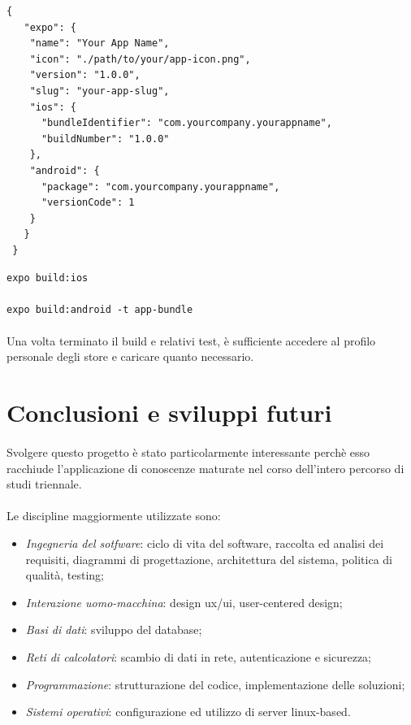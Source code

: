 \documentclass[11pt,a4paper,english]{article}
\begin{document}
\begin{lstlisting}[title=Struttura del file di configurazione]
{
   "expo": {
    "name": "Your App Name",
    "icon": "./path/to/your/app-icon.png",
    "version": "1.0.0",
    "slug": "your-app-slug",
    "ios": {
      "bundleIdentifier": "com.yourcompany.yourappname",
      "buildNumber": "1.0.0"
    },
    "android": {
      "package": "com.yourcompany.yourappname",
      "versionCode": 1
    }
   }
 }
\end{lstlisting}

\begin{lstlisting}[title=Comandi per effettuare il build delle due app]
expo build:ios     

expo build:android -t app-bundle
\end{lstlisting}

\paragraph{} Una volta terminato il build e relativi test, è sufficiente accedere al profilo personale degli store e caricare quanto necessario. 


\section{Conclusioni e sviluppi futuri}

\paragraph{} Svolgere questo progetto è stato particolarmente interessante perchè esso racchiude l'applicazione di conoscenze maturate nel corso dell'intero percorso di studi triennale. 

\paragraph{} Le discipline maggiormente utilizzate sono:
\begin{itemize}
    \item \emph{Ingegneria del sotfware}: ciclo di vita del software, raccolta ed analisi dei requisiti, diagrammi di progettazione, architettura del sistema, politica di qualità, testing;
    \item \emph{Interazione uomo-macchina}: design ux/ui, user-centered design;
    \item \emph{Basi di dati}: sviluppo del database;
    \item \emph{Reti di calcolatori}: scambio di dati in rete, autenticazione e sicurezza;
    \item \emph{Programmazione}: strutturazione del codice, implementazione delle soluzioni;
    \item \emph{Sistemi operativi}: configurazione ed utilizzo di server linux-based.
\end{itemize}
\end{document}
